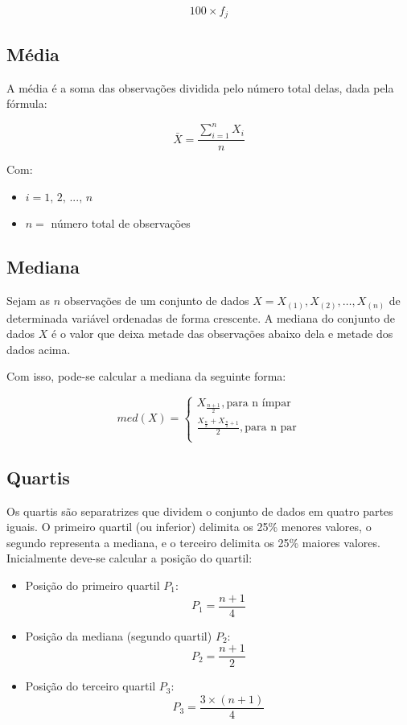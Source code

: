 \documentclass[
]{estat/estat}
\begin{document}
\[100 \times f_j\]

\subsection{Média}\label{muxe9dia}

A média é a soma das observações dividida pelo número total delas, dada
pela fórmula:

\[\bar{X}=\frac{\sum\limits_{i=1}^{n}X_i}{n}\]

Com:

\begin{itemize}
\item
  \(i = 1, \, 2, \, ..., \, n\)
\item
  \(n =\) número total de observações
\end{itemize}

\subsection{Mediana}\label{mediana}

Sejam as \(n\) observações de um conjunto de dados
\(X=X_{(1)},X_{(2)},\ldots, X_{(n)}\) de determinada variável ordenadas
de forma crescente. A mediana do conjunto de dados \(X\) é o valor que
deixa metade das observações abaixo dela e metade dos dados acima.

Com isso, pode-se calcular a mediana da seguinte forma:

\[
med(X) =
    \begin{cases}
         X_{\frac{n+1}{2}}, \textrm{para n ímpar} \\
         \frac{X_{\frac{n}{2}}+X_{\frac{n}{2} + 1}}{2}, \textrm{para n par} \\
    \end{cases}
\]

\subsection{Quartis}\label{quartis}

Os quartis são separatrizes que dividem o conjunto de dados em quatro
partes iguais. O primeiro quartil (ou inferior) delimita os 25\% menores
valores, o segundo representa a mediana, e o terceiro delimita os 25\%
maiores valores. Inicialmente deve-se calcular a posição do quartil:

\begin{itemize}
\item
  Posição do primeiro quartil \(P_1\): \[P_1=\frac{n+1}{4}\]
\item
  Posição da mediana (segundo quartil) \(P_2\): \[P_2 = \frac{n+1}{2}\]
\item
  Posição do terceiro quartil \(P_3\): \[P_3=\frac{3 \times (n+1)}{4}\]
\end{itemize}
\end{document}
